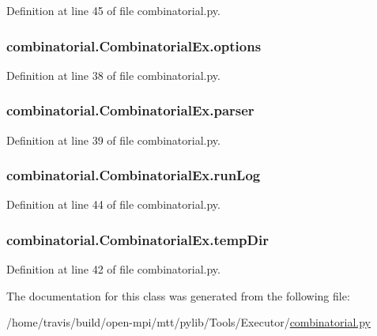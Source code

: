 Definition at line 45 of file combinatorial.\-py.

\hypertarget{classcombinatorial_1_1CombinatorialEx_a20eda525b3947495bb6084c560dcca27}{
\subsubsection[{options}]{\setlength{\rightskip}{0pt plus 5cm}combinatorial.\-Combinatorial\-Ex.\-options}}\label{classcombinatorial_1_1CombinatorialEx_a20eda525b3947495bb6084c560dcca27}


Definition at line 38 of file combinatorial.\-py.

\hypertarget{classcombinatorial_1_1CombinatorialEx_ab5c27fece8991a34f47e85870637fc91}{
\subsubsection[{parser}]{\setlength{\rightskip}{0pt plus 5cm}combinatorial.\-Combinatorial\-Ex.\-parser}}\label{classcombinatorial_1_1CombinatorialEx_ab5c27fece8991a34f47e85870637fc91}


Definition at line 39 of file combinatorial.\-py.

\hypertarget{classcombinatorial_1_1CombinatorialEx_a3de3f7da4c201525da8452258df0bc7b}{
\subsubsection[{run\-Log}]{\setlength{\rightskip}{0pt plus 5cm}combinatorial.\-Combinatorial\-Ex.\-run\-Log}}\label{classcombinatorial_1_1CombinatorialEx_a3de3f7da4c201525da8452258df0bc7b}


Definition at line 44 of file combinatorial.\-py.

\hypertarget{classcombinatorial_1_1CombinatorialEx_a24b3bc621a8380e406bade192bc371d4}{
\subsubsection[{temp\-Dir}]{\setlength{\rightskip}{0pt plus 5cm}combinatorial.\-Combinatorial\-Ex.\-temp\-Dir}}\label{classcombinatorial_1_1CombinatorialEx_a24b3bc621a8380e406bade192bc371d4}


Definition at line 42 of file combinatorial.\-py.



The documentation for this class was generated from the following file\-:\begin{DoxyCompactItemize}
\item 
/home/travis/build/open-\/mpi/mtt/pylib/\-Tools/\-Executor/\hyperlink{combinatorial_8py}{combinatorial.\-py}\end{DoxyCompactItemize}
